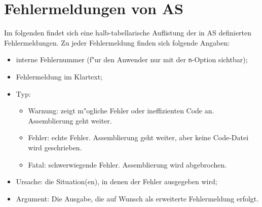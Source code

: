 \documentclass[12pt,a4paper,twoside]{report}
\newcommand{\tty}[1]{{\tt #1}}
\newcommand{\asname}{AS}
\begin{document}
\cleardoublepage
\chapter{Fehlermeldungen von \asname{}}
\label{ChapErrMess}

Im folgenden findet sich eine halb-tabellarische Auflistung der in \asname{}
definierten Fehlermeldungen.  Zu jeder Fehlermeldung finden sich folgende
Angaben:
\begin{itemize}
\item{interne Fehlernummer (f"ur den Anwender nur mit der \tty{n}-Option sichtbar);}
\item{Fehlermeldung im Klartext;}
\item{Typ:
      \begin{itemize}
      \item{Warnung: zeigt m"ogliche Fehler oder ineffizienten Code an.
            Assemblierung geht weiter.}
      \item{Fehler: echte Fehler.  Assemblierung geht weiter, aber keine
            Code-Datei wird geschrieben.}
      \item{Fatal: schwerwiegende Fehler.  Assemblierung wird abgebrochen.}
      \end{itemize}}
\item{Ursache: die Situation(en), in denen der Fehler ausgegeben
      wird;}
\item{Argument: Die Ausgabe, die auf Wunsch als erweiterte Fehlermeldung
      erfolgt.}
\end{itemize}

\par

\newcommand{\errentry}[5]
           {\item[#1]{#2
                      \begin{description}
                      \item[Typ:]{\ \\#3}
                      \item[Ursache:]{\ \\#4}
                      \item[Argument:]{\ \\#5}
                      \end{description}}
           }
\end{document}
